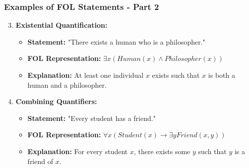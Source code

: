 \documentclass[aspectratio=169]{beamer}
\begin{document}
\begin{frame}[fragile]
    \frametitle{Examples of FOL Statements - Part 2}
    \begin{enumerate}
        \setcounter{enumi}{2} %
        
        \item \textbf{Existential Quantification:}
        \begin{itemize}
            \item \textbf{Statement:} "There exists a human who is a philosopher."
            \item \textbf{FOL Representation:} $\exists x (Human(x) \land Philosopher(x))$
            \item \textbf{Explanation:} At least one individual $x$ exists such that $x$ is both a human and a philosopher.
        \end{itemize}

        \item \textbf{Combining Quantifiers:}
        \begin{itemize}
            \item \textbf{Statement:} "Every student has a friend."
            \item \textbf{FOL Representation:} $\forall x (Student(x) \rightarrow \exists y Friend(x, y))$
            \item \textbf{Explanation:} For every student $x$, there exists some $y$ such that $y$ is a friend of $x$.
        \end{itemize}
    \end{enumerate}
\end{frame}
\end{document}
